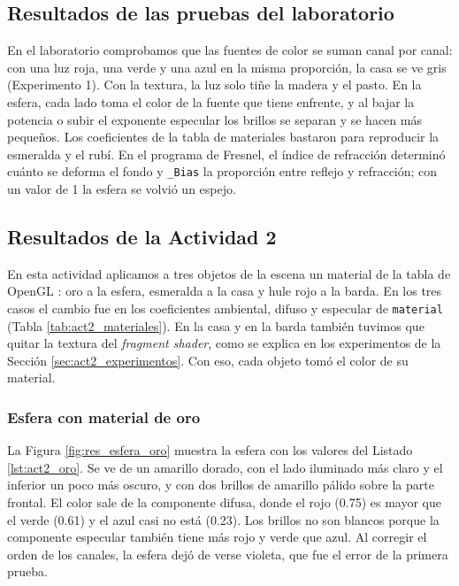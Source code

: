 \subsection{Resultados de las pruebas del laboratorio}
En el laboratorio comprobamos que las fuentes de color se suman canal por canal: con una luz roja, una verde y una azul en la misma proporción, la casa se ve gris (Experimento 1). Con la textura, la luz solo tiñe la madera y el pasto. En la esfera, cada lado toma el color de la fuente que tiene enfrente, y al bajar la potencia o subir el exponente especular los brillos se separan y se hacen más pequeños. Los coeficientes de la tabla de materiales bastaron para reproducir la esmeralda y el rubí. En el programa de Fresnel, el índice de refracción determinó cuánto se deforma el fondo y \texttt{\_Bias} la proporción entre reflejo y refracción; con un valor de 1 la esfera se volvió un espejo.


\subsection{Resultados de la Actividad 2}
\label{sec:act2_resultados}

En esta actividad aplicamos a tres objetos de la escena un material de la tabla de OpenGL \cite{devernay_materials}: oro a la esfera, esmeralda a la casa y hule rojo a la barda. En los tres casos el cambio fue en los coeficientes ambiental, difuso y especular de \texttt{material} (Tabla \ref{tab:act2_materiales}). En la casa y en la barda también tuvimos que quitar la textura del \textit{fragment shader}, como se explica en los experimentos de la Sección \ref{sec:act2_experimentos}. Con eso, cada objeto tomó el color de su material.

\subsubsection{Esfera con material de oro}
La Figura \ref{fig:res_esfera_oro} muestra la esfera con los valores del Listado \ref{lst:act2_oro}. Se ve de un amarillo dorado, con el lado iluminado más claro y el inferior un poco más oscuro, y con dos brillos de amarillo pálido sobre la parte frontal. El color sale de la componente difusa, donde el rojo (0.75) es mayor que el verde (0.61) y el azul casi no está (0.23). Los brillos no son blancos porque la componente especular también tiene más rojo y verde que azul. Al corregir el orden de los canales, la esfera dejó de verse violeta, que fue el error de la primera prueba.

